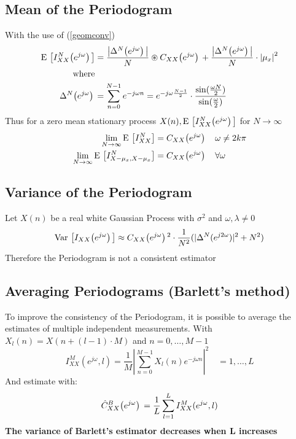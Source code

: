 \documentclass[accentcolor=tud4c,9.5pt,nochapname,bigchapter,paper=a5report]{tudreport}
\begin{document}
\subsection{Mean of the Periodogram}
With the use of (\ref{geomconv})
\begin{subequations}
\begin{align}
{\rm E}\,\left[I_{XX}^{N}{\left(e^{j\omega}\right)}\,\right] &= \frac{\left|\Delta^N{\left(e^{j\omega}\right)}\,\right|}{N} \circledast C_{XX}{\left(e^{j\omega}\right)}\, 
+\frac{\left|\Delta^N{\left(e^{j\omega}\right)}\,\right|}{N} \cdot \left|\mu_x\right|^2 \\
\text{where} \notag \\
\Delta^N{\left(e^{j\omega}\right)}\, &= \sum\limits_{n=0}^{N-1}e^{-j\omega n} = e ^{-j \omega \frac{N-1}{2}} \cdot \frac{\sin(\frac{\omega N}{2})}{\sin(\frac{\omega}{2})}
\end{align}
\end{subequations}
Thus for a zero mean stationary process $X(n),{\rm E}\,\left[I_{XX}^{N}{\left(e^{j\omega}\right)}\,\right]$ for $N\rightarrow\infty$
\begin{subequations}
\begin{align}
\lim\limits_{N\rightarrow\infty} {\rm E}\,\left[I_{XX}^{N}\right] &= C_{XX}{\left(e^{j\omega}\right)}\, \quad \omega \neq 2k\pi \\
\lim\limits_{N\rightarrow\infty} {\rm E}\,\left[I_{X-\mu_x,X-\mu_x}^{N}\right] &= C_{XX}{\left(e^{j\omega}\right)}\, \quad \forall\omega
\end{align}
\end{subequations}

\subsection{Variance of the Periodogram}
Let $X(n)$ be a real white Gaussian Process with $\sigma^2$ and $\omega,\lambda \neq 0$
\begin{equation}
{\rm Var}\,\left[I_{XX}{\left(e^{j\omega}\right)}\,\right] \approx C_{XX}{\left(e^{j\omega}\right)}\,^2 \cdot \frac{1}{N^2}(|\Delta^N(e^{j2\omega})|^2+N^2)
\end{equation}
Therefore the Periodogram is not a consistent estimator

\subsection{Averaging Periodograms (Barlett's method)}
To improve the consistency of the Periodogram, it is 
possible to average the estimates of multiple independent measurements. With $X_l(n)=X(n+(l-1)\cdot M)$ and $n=0,\ldots,M-1$
\begin{equation}
I_{XX}^M(e^{j\omega},l)=\frac{1}{M}\left|\sum\limits_{n=0}^{M-1} X_l(n) e^{-j\omega n}\right|^2 \quad = 1,\ldots,L
\end{equation}
And estimate with:
\begin{equation}
\hat{C}_{XX}^B{\left(e^{j\omega}\right)}\, = \frac{1}{L}\sum\limits_{l=1}^{L} I_{XX}^M (e^{j\omega},l)
\end{equation}
{\bf The variance of Barlett's estimator decreases when L increases}
\end{document}
